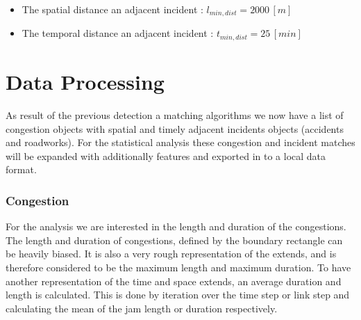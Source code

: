 \begin{itemize}
	\item The spatial distance an adjacent incident : $l_{min,dist} = 2000 \, [m]$
	\item The temporal distance an adjacent incident : $t_{min,dist} = 25 \, [min]$
\end{itemize}

\section{Data Processing}
\label{methodology_data_processing}
As result of the previous detection a matching algorithms we now have a list of congestion objects with spatial and timely adjacent incidents objects (accidents and roadworks). For the statistical analysis these congestion and incident matches will be expanded with additionally features and exported in to a local data format.

\subsubsection{Congestion}
For the analysis we are interested in the length and duration of the congestions. The length and duration of congestions, defined by the boundary rectangle can be heavily biased. It is also a very rough representation of the extends, and is therefore considered to be the maximum length and maximum duration. To have another representation of the time and space extends, an average duration and length is calculated. This is done by iteration over the time step or link step and calculating the mean of the jam length or duration respectively.

